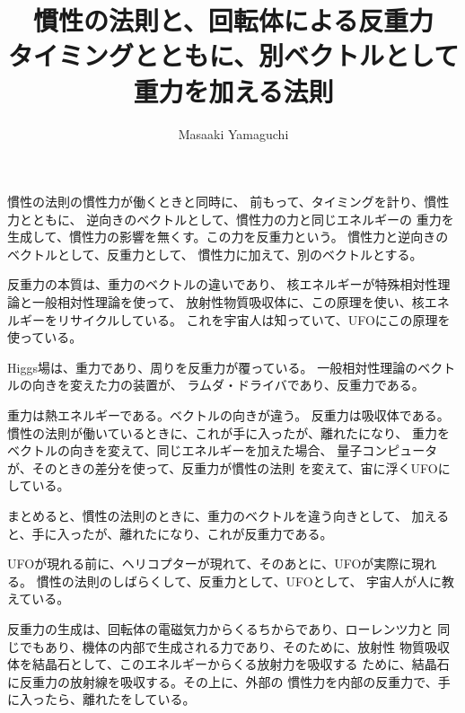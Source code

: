\documentclass{jsarticle}
\begin{document}
\title{慣性の法則と、回転体による反重力 \\
タイミングとともに、別ベクトルとして重力を加える法則}
\author{Masaaki Yamaguchi}
\date{}
\maketitle

   慣性の法則の慣性力が働くときと同時に、
   前もって、タイミングを計り、慣性力とともに、
   逆向きのベクトルとして、慣性力の力と同じエネルギーの
   重力を生成して、慣性力の影響を無くす。この力を反重力という。
   慣性力と逆向きのベクトルとして、反重力として、
   慣性力に加えて、別のベクトルとする。

   反重力の本質は、重力のベクトルの違いであり、
   核エネルギーが特殊相対性理論と一般相対性理論を使って、
   放射性物質吸収体に、この原理を使い、核エネルギーをリサイクルしている。
   これを宇宙人は知っていて、UFOにこの原理を使っている。

   Higgs場は、重力であり、周りを反重力が覆っている。
   一般相対性理論のベクトルの向きを変えた力の装置が、
   ラムダ・ドライバであり、反重力である。

   重力は熱エネルギーである。ベクトルの向きが違う。
   反重力は吸収体である。
   慣性の法則が働いているときに、これが手に入ったが、離れたになり、
   重力をベクトルの向きを変えて、同じエネルギーを加えた場合、
   量子コンピュータが、そのときの差分を使って、反重力が慣性の法則
   を変えて、宙に浮くUFOにしている。 

   まとめると、慣性の法則のときに、重力のベクトルを違う向きとして、
   加えると、手に入ったが、離れたになり、これが反重力である。 

   UFOが現れる前に、ヘリコプターが現れて、そのあとに、UFOが実際に現れる。
   慣性の法則のしばらくして、反重力として、UFOとして、
   宇宙人が人に教えている。

   反重力の生成は、回転体の電磁気力からくるちからであり、ローレンツ力と
   同じでもあり、機体の内部で生成される力であり、そのために、放射性
   物質吸収体を結晶石として、このエネルギーからくる放射力を吸収する
   ために、結晶石に反重力の放射線を吸収する。その上に、外部の
   慣性力を内部の反重力で、手に入ったら、離れたをしている。
\end{document}
